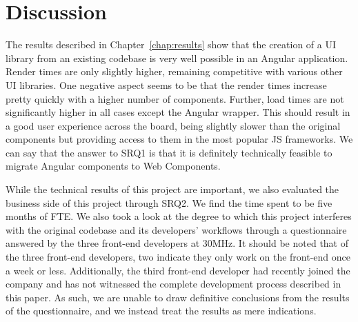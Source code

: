 \chapter{Discussion}\label{chap:discussion}

The results described in Chapter~\ref{chap:results} show that the creation of a UI library from an existing codebase is very well possible in an Angular application. Render times are only slightly higher, remaining competitive with various other UI libraries. One negative aspect seems to be that the render times increase pretty quickly with a higher number of components. Further, load times are not significantly higher in all cases except the Angular wrapper. This should result in a good user experience across the board, being slightly slower than the original components but providing access to them in the most popular JS frameworks. We can say that the answer to SRQ1 is that it is definitely technically feasible to migrate Angular components to Web Components.

While the technical results of this project are important, we also evaluated the business side of this project through SRQ2. We find the time spent to be five months of FTE\@. We also took a look at the degree to which this project interferes with the original codebase and its developers' workflows through a questionnaire answered by the three front-end developers at 30MHz. It should be noted that of the three front-end developers, two indicate they only work on the front-end once a week or less. Additionally, the third front-end developer had recently joined the company and has not witnessed the complete development process described in this paper. As such, we are unable to draw definitive conclusions from the results of the questionnaire, and we instead treat the results as mere indications.

